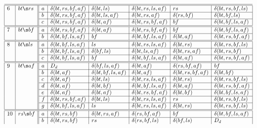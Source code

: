 \begin{table*}[!]
\[\begin{array}{|l|l||l|l|l|l|l|l|}
\hline\hline
6 & bt\s rs &
               a & \delta(bt,rs,bf,af) & \delta(bt,ls) & \delta(bt,rs,ls,af) & rs & \delta(bt,rs,bf,ls)\\
\cline{3-8} && b & \delta(bt,rs,bf,af) & \delta(bt,ls,af) & \delta(bt,rs,af) & \delta(rs,bf) & \delta(bt,bf,ls)\\
\cline{3-8} && c & \delta(bt,rs,bf,af) & \delta(bt,af) & \delta(bt,rs,bf,af) & bf & \delta(bt,bf,ls,af)\\
\hline\hline
7 & bt\s bf &
               a & \delta(bt,rs,bf,af) & \delta(bt,af) & \delta(bt,rs,bf,af) & bf & \delta(bt,bf,ls,af)\\
\cline{3-8} && b & \delta(bt,bf,ls,af) & bf & \delta(bt,bf,ls,af) & \delta(bt,af) & \delta(bt,rs,bf,af)\\
\hline\hline
8 & bt\s ls &
               a & \delta(bt,bf,ls,af) & ls & \delta(bt,rs,ls,af) & \delta(bt,rs) & \delta(bt,rs,bf,ls)\\
\cline{3-8} && b & \delta(bt,bf,ls,af) & \delta(bf,ls) & \delta(bt,ls,af) & \delta(bt,rs,af) & \delta(bt,rs,bf)\\
\cline{3-8} && c & \delta(bt,bf,ls,af) & bf & \delta(bt,bf,ls,af) & \delta(bt,af) & \delta(bt,rs,bf,af)\\
\hline\hline
9 & bt\s af &
               a & D_d & \delta(bf,ls,af) & \delta(bt,af) & \delta(rs,bf,af) & bf\\
\cline{3-8} && b & \delta(bt,af) & \delta(bt,bf,ls,af) & \delta(bt,af) & \delta(bt,rs,bf,af) & \delta(bt,bf)\\
\cline{3-8} && c & \delta(bt,af) & \delta(bt,ls) & \delta(bt,rs,ls,af) & \delta(bt,rs) & \delta(bt,rs,bf,ls)\\
\cline{3-8} && d & \delta(bt,af) & \delta(bt,bf) & \delta(bt,bf,ls,af) & \delta(bt,af) & \delta(bt,rs,bf,af)\\
\cline{3-8} && e & \delta(bt,af) & \delta(bt,af) & \delta(bt,rs,bf,af) & \delta(bt,bf) & \delta(bt,bf,ls,af)\\
\cline{3-8} && f & \delta(bt,rs,bf,af) & \delta(bt,ls) & \delta(bt,rs,ls,af) & rs & \delta(bt,rs,bf,ls)\\
\cline{3-8} && g & \delta(bt,bf,ls,af) & ls & \delta(bt,rs,ls,af) & \delta(bt,rs) & \delta(bt,rs,bf,ls)\\
\hline\hline
10 & rs\s bf &
               a & \delta(bt,rs,bf) & \delta(bt,rs,af) & \delta(rs,bf,af) & bf & \delta(bt,bf,ls,af)\\
\cline{3-8} && b & \delta(bt,rs,bf) & rs & \delta(rs,bf,ls) & \delta(bf,ls) & D_d\\

\end{array}\]
\end{table*}
